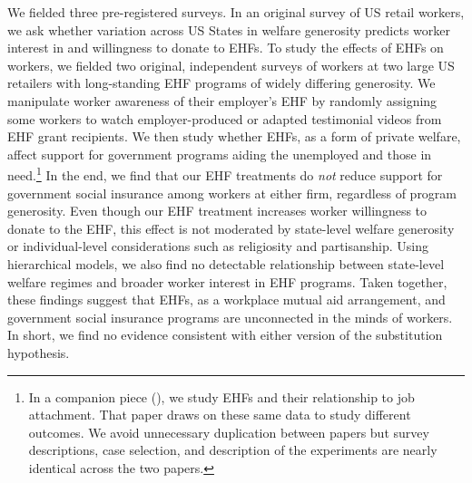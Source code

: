 \documentclass[
  11pt,
  oneside]{article}
\begin{document}
We fielded three pre-registered surveys. In an original survey of US retail workers, we ask whether variation across US States in welfare generosity predicts worker interest in and willingness to donate to EHFs. To study the effects of EHFs on workers, we fielded two original, independent surveys of workers at two large US retailers with long-standing EHF programs of widely differing generosity. We manipulate worker awareness of their employer's EHF by randomly assigning some workers to watch employer-produced or adapted testimonial videos from EHF grant recipients. We then study whether EHFs, as a form of private welfare, affect support for government programs aiding the unemployed and those in need.\footnote{In a companion piece (), we study EHFs and their relationship to job attachment. That paper draws on these same data to study different outcomes. We avoid unnecessary duplication between papers but survey descriptions, case selection, and description of the experiments are nearly identical across the two papers.} In the end, we find that our EHF treatments do \emph{not} reduce support for government social insurance among workers at either firm, regardless of program generosity. Even though our EHF treatment increases worker willingness to donate to the EHF, this effect is not moderated by state-level welfare generosity or individual-level considerations such as religiosity and partisanship. Using hierarchical models, we also find no detectable relationship between state-level welfare regimes and broader worker interest in EHF programs. Taken together, these findings suggest that EHFs, as a workplace mutual aid arrangement, and government social insurance programs are unconnected in the minds of workers. In short, we find no evidence consistent with either version of the substitution hypothesis.
\end{document}
